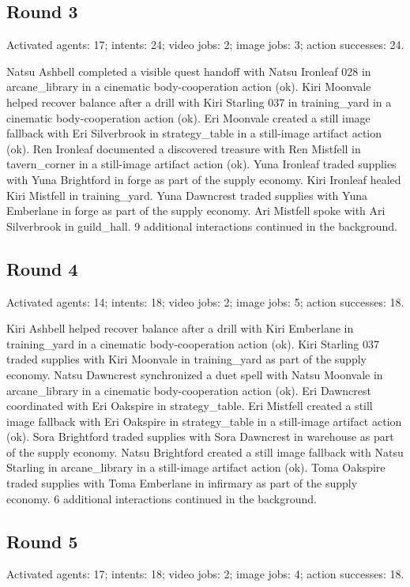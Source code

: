 \documentclass[11pt,a4paper]{article}
\begin{document}
\subsection{Round 3}
Activated agents: 17; intents: 24; video jobs: 2; image jobs: 3; action successes: 24.

Natsu Ashbell completed a visible quest handoff with Natsu Ironleaf 028 in arcane\_library in a cinematic body-cooperation action (ok). Kiri Moonvale helped recover balance after a drill with Kiri Starling 037 in training\_yard in a cinematic body-cooperation action (ok). Eri Moonvale created a still image fallback with Eri Silverbrook in strategy\_table in a still-image artifact action (ok). Ren Ironleaf documented a discovered treasure with Ren Mistfell in tavern\_corner in a still-image artifact action (ok). Yuna Ironleaf traded supplies with Yuna Brightford in forge as part of the supply economy. Kiri Ironleaf healed Kiri Mistfell in training\_yard. Yuna Dawncrest traded supplies with Yuna Emberlane in forge as part of the supply economy. Ari Mistfell spoke with Ari Silverbrook in guild\_hall. 9 additional interactions continued in the background.

\subsection{Round 4}
Activated agents: 14; intents: 18; video jobs: 2; image jobs: 5; action successes: 18.

Kiri Ashbell helped recover balance after a drill with Kiri Emberlane in training\_yard in a cinematic body-cooperation action (ok). Kiri Starling 037 traded supplies with Kiri Moonvale in training\_yard as part of the supply economy. Natsu Dawncrest synchronized a duet spell with Natsu Moonvale in arcane\_library in a cinematic body-cooperation action (ok). Eri Dawncrest coordinated with Eri Oakspire in strategy\_table. Eri Mistfell created a still image fallback with Eri Oakspire in strategy\_table in a still-image artifact action (ok). Sora Brightford traded supplies with Sora Dawncrest in warehouse as part of the supply economy. Natsu Brightford created a still image fallback with Natsu Starling in arcane\_library in a still-image artifact action (ok). Toma Oakspire traded supplies with Toma Emberlane in infirmary as part of the supply economy. 6 additional interactions continued in the background.

\subsection{Round 5}
Activated agents: 17; intents: 18; video jobs: 2; image jobs: 4; action successes: 18.
\end{document}
